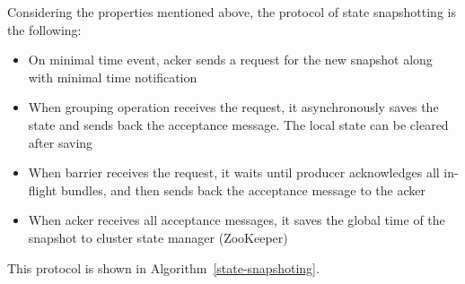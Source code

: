 Considering the properties mentioned above, the protocol of state snapshotting is the following:

\begin{itemize}
    \item On minimal time event, acker sends a request for the new snapshot along with minimal time notification
    \item When grouping operation receives the request, it asynchronously saves the state and sends back the acceptance message. The local state can be cleared after saving
    \item When barrier receives the request, it waits until producer acknowledges all in-flight bundles, and then sends back the acceptance message to the acker
    \item When acker receives all acceptance messages, it saves the global time of the snapshot to cluster state manager (ZooKeeper) 
\end{itemize}

This protocol is shown in Algorithm~\ref{state-snapshoting}.

